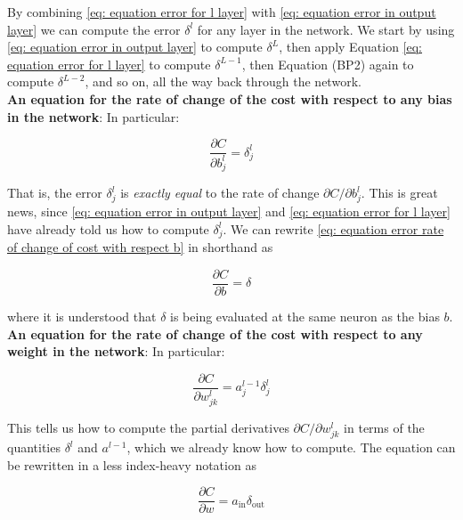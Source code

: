 By combining \ref{eq: equation error for l layer} with \ref{eq: equation error in output layer} we can compute the error $\delta^l$ for any layer in the network. We start by using \ref{eq: equation error in output layer} to compute $\delta^L$, then apply Equation \ref{eq: equation error for l layer} to compute $\delta^{L-1}$, then Equation (BP2) again to compute $\delta^{L-2}$, and so on, all the way back through the network.\\

\textbf{An equation for the rate of change of the cost with respect to any bias in the network}: In particular:

\begin{equation}
\frac{\partial C}{\partial b^l_j}=\delta^l_j
\tag{BP3}
\label{eq: equation error rate of change of cost with respect b}
\end{equation}

That is, the error $\delta^l_j$ is \textit{exactly equal} to the rate of change $\partial C/\partial b^l_j$. This is great news, since \ref{eq: equation error in output layer} and \ref{eq: equation error for l layer} have already told us how to compute $\delta^l_j$. We can rewrite \ref{eq: equation error rate of change of cost with respect b} in shorthand as

\begin{equation}
\frac{\partial C}{\partial b}=\delta
\label{eq: equation error rate of change of cost with respect b shorthand}
\end{equation}

where it is understood that $\delta$ is being evaluated at the same neuron as the bias $b$.\\

\textbf{An equation for the rate of change of the cost with respect to any weight in the network}: In particular:

\begin{equation}
\frac{\partial C}{\partial w^l_{jk}}=a^{l-1}_j \delta^l_j 
\tag{BP4}
\label{eq: equation error rate of change of cost with respect w}
\end{equation}

This tells us how to compute the partial derivatives $\partial C/\partial w^l_{jk}$ in terms of the quantities $\delta^l$ and $a^{l-1}$, which we already know how to compute. The equation can be rewritten in a less index-heavy notation as

\begin{equation}
\frac{\partial C}{\partial w}=a_{\text{in}} \delta_{\text{out}}
\label{eq: equation error rate of change of cost with respect weight shorthand}
\end{equation}

